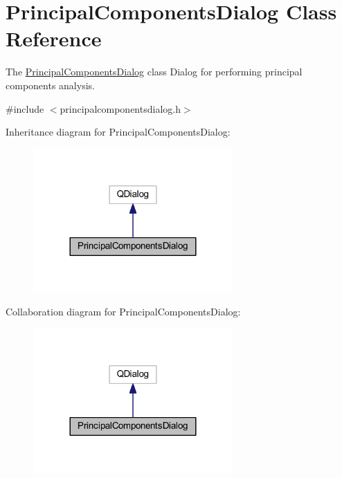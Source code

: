 \hypertarget{class_principal_components_dialog}{\section{Principal\+Components\+Dialog Class Reference}
\label{class_principal_components_dialog}
}


The \hyperlink{class_principal_components_dialog}{Principal\+Components\+Dialog} class Dialog for performing principal components analysis.  




{\ttfamily \#include $<$principalcomponentsdialog.\+h$>$}



Inheritance diagram for Principal\+Components\+Dialog\+:\nopagebreak
\begin{figure}[H]
\begin{center}
\leavevmode
\includegraphics[width=216pt]{class_principal_components_dialog__inherit__graph}
\end{center}
\end{figure}


Collaboration diagram for Principal\+Components\+Dialog\+:\nopagebreak
\begin{figure}[H]
\begin{center}
\leavevmode
\includegraphics[width=216pt]{class_principal_components_dialog__coll__graph}
\end{center}
\end{figure}
